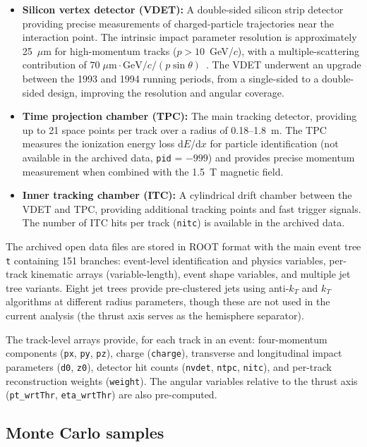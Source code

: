 \documentclass[11pt,a4paper]{article}
\begin{document}
\begin{itemize}
\item \textbf{Silicon vertex detector (VDET):} A double-sided silicon strip detector
providing precise measurements of charged-particle trajectories near the interaction
point. The intrinsic impact parameter resolution is approximately 25~$\mu$m for
high-momentum tracks ($p > 10$~GeV/$c$), with a multiple-scattering contribution
of $70\;\mu\mathrm{m}\cdot\mathrm{GeV}/c / (p \sin\theta)$~\cite{ALEPH:VDET}.
The VDET underwent an upgrade between the 1993 and 1994 running periods,
from a single-sided to a double-sided design, improving the resolution and
angular coverage.

\item \textbf{Time projection chamber (TPC):} The main tracking detector, providing
up to 21 space points per track over a radius of 0.18--1.8~m. The TPC measures
the ionization energy loss d$E$/d$x$ for particle identification (not available
in the archived data, \texttt{pid} = $-999$) and provides precise momentum
measurement when combined with the 1.5~T magnetic field.

\item \textbf{Inner tracking chamber (ITC):} A cylindrical drift chamber between the
VDET and TPC, providing additional tracking points and fast trigger signals. The
number of ITC hits per track (\texttt{nitc}) is available in the archived data.
\end{itemize}

The archived open data files are stored in ROOT format with the main event tree
\texttt{t} containing 151 branches: event-level identification and physics variables,
per-track kinematic arrays (variable-length), event shape variables, and multiple jet
tree variants. Eight jet trees provide pre-clustered jets using anti-$k_T$ and
$k_T$ algorithms at different radius parameters, though these are not used in the
current analysis (the thrust axis serves as the hemisphere separator).

The track-level arrays provide, for each track in an event: four-momentum components
(\texttt{px}, \texttt{py}, \texttt{pz}), charge (\texttt{charge}), transverse and
longitudinal impact parameters (\texttt{d0}, \texttt{z0}), detector hit counts
(\texttt{nvdet}, \texttt{ntpc}, \texttt{nitc}), and per-track reconstruction weights
(\texttt{weight}). The angular variables relative to the thrust axis (\texttt{pt\_wrtThr},
\texttt{eta\_wrtThr}) are also pre-computed.

\subsection{Monte Carlo samples}
\label{sec:mc_samples}
\end{document}
